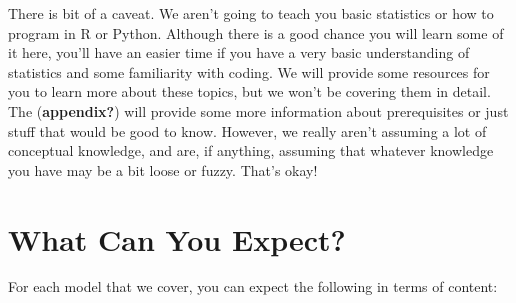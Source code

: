 \documentclass[
  letterpaper,
]{krantz}
\begin{document}
There is bit of a caveat. We aren't going to teach you basic statistics
or how to program in R or Python. Although there is a good chance you
will learn some of it here, you'll have an easier time if you have a
very basic understanding of statistics and some familiarity with coding.
We will provide some resources for you to learn more about these topics,
but we won't be covering them in detail. The (\textbf{appendix?}) will
provide some more information about prerequisites or just stuff that
would be good to know. However, we really aren't assuming a lot of
conceptual knowledge, and are, if anything, assuming that whatever
knowledge you have may be a bit loose or fuzzy. That's okay!

\section{What Can You Expect?}\label{what-can-you-expect}

For each model that we cover, you can expect the following in terms of
content:
\end{document}
